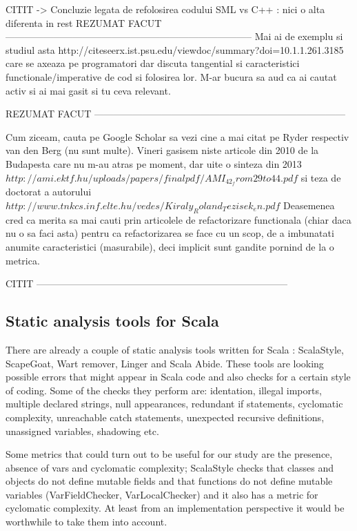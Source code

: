 \documentclass{article}
\begin{document}
CITIT -> Concluzie legata de refolosirea codului SML vs C++ : nici o alta diferenta in rest        
REZUMAT FACUT
-----------------------------------------------------------------------------
Mai ai de exemplu si studiul asta
        http://citeseerx.ist.psu.edu/viewdoc/summary?doi=10.1.1.261.3185
care se axeaza pe programatori dar discuta tangential si caracteristici
functionale/imperative de cod si folosirea lor.
M-ar bucura sa aud ca ai cautat activ si ai mai gasit si tu ceva relevant.


REZUMAT FACUT
------------------------------------------------------------------------------

Cum ziceam, cauta pe Google Scholar sa vezi cine a mai citat pe
Ryder respectiv van den Berg (nu sunt multe). Vineri gasisem niste
articole din 2010 de la Budapesta care nu m-au atras pe moment,
dar uite o sinteza din 2013
        $http://ami.ektf.hu/uploads/papers/finalpdf/AMI_42_from29to44.pdf$
si teza de doctorat a autorului
$        http://www.tnkcs.inf.elte.hu/vedes/Kiraly_Roland_Tezisek_en.pdf$
Deasemenea cred ca merita sa mai cauti prin articolele de refactorizare
functionala (chiar daca nu o sa faci asta) pentru ca refactorizarea
se face cu un scop, de a imbunatati anumite caracteristici (masurabile),
deci implicit sunt gandite pornind de la o metrica.

CITIT
------------------------------------------------------------------------------
\subsection {Static analysis tools for Scala}
There are already a couple of static analysis tools written for Scala : ScalaStyle, ScapeGoat, Wart remover, Linger and Scala Abide. These tools are looking possible errors that might appear in Scala code and also checks for a certain style of coding. Some of the checks they perform are: identation, illegal imports, multiple declared strings, null appearances, redundant if statements, cyclomatic complexity, unreachable catch statements, unexpected recursive definitions, unassigned variables, shadowing etc. \par

Some metrics that could turn out to be useful for our study are  the presence, absence of vars and cyclomatic complexity; ScalaStyle checks that classes and objects do not define mutable fields and that functions do not define mutable variables (VarFieldChecker, VarLocalChecker) \cite{scalastyle} and it also has a metric for cyclomatic complexity. At least from an implementation perspective it would be worthwhile to take them into account.\par
\end{document}
